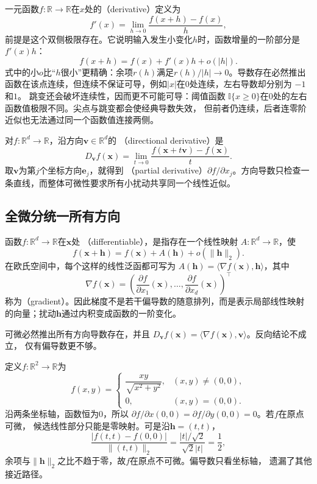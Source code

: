 一元函数$f:\mathbb{R}\to\mathbb{R}$在$x$处的（derivative）定义为
\[   f'(x)=\lim_{h\to0}\frac{f(x+h)-f(x)}{h}, \]
前提是这个双侧极限存在。它说明输入发生小变化$h$时，函数增量的一阶部分是$f'(x)h$：
\begin{equation}
  f(x+h)=f(x)+f'(x)h+o(|h|).
\label{eq:analysis-scalar-first-order}
\end{equation}
式中的小$o$比“$h$很小”更精确：余项$r(h)$满足$r(h)/|h|\to0$。导数存在必然推出函数在该点连续，但连续不保证可导，例如$|x|$在$0$处连续，左右导数却分别为 $-1$和$1$。
跳变还会破坏连续性，因而更不可能可导：阈值函数
$\mathbb{I}\{x\geq0\}$在$0$处的左右函数值极限不同。尖点与跳变都会使经典导数失效，
但前者仍连续，后者连零阶近似也无法通过同一个函数值连接两侧。

对$f:\mathbb{R}^d\to\mathbb{R}$，沿方向$\bm{v}\in\mathbb{R}^d$的
（directional derivative）是
\[   D_{\bm{v}}f(\bm{x})   =   \lim_{t\to0}   \frac{f(\bm{x}+t\bm{v})-f(\bm{x})}{t}. \]
取$\bm{v}$为第$j$个坐标方向$\bm{e}_j$，就得到
（partial derivative）$\partial f/\partial x_j$。方向导数只检查一条直线，而整体可微性要求所有小扰动共享同一个线性近似。
\subsection{全微分统一所有方向}

函数$f:\mathbb{R}^d\to\mathbb{R}$在$\bm{x}$处
（differentiable），是指存在一个线性映射 $A:\mathbb{R}^d\to\mathbb{R}$，使
\begin{equation}
  f(\bm{x}+\bm{h})
  =
  f(\bm{x})+A(\bm{h})+o(\lVert\bm{h}\rVert_2).
\label{eq:analysis-total-differentiability}
\end{equation}
在欧氏空间中，每个这样的线性泛函都可写为 $A(\bm{h})=\langle\nabla f(\bm{x}),\bm{h}\rangle$，其中
\[   \nabla f(\bm{x})   =   \left(     \frac{\partial f}{\partial x_1}(\bm{x}),\ldots,     \frac{\partial f}{\partial x_d}(\bm{x})   \right)^{\top} \]
称为（gradient）。因此梯度不是若干偏导数的随意排列，而是表示局部线性映射的向量；扰动$\bm{h}$通过内积变成函数的一阶变化。

可微必然推出所有方向导数存在，并且 $D_{\bm{v}}f(\bm{x})=\langle\nabla f(\bm{x}),\bm{v}\rangle$。反向结论不成立， 仅有偏导数更不够。
\begin{example}[偏导数存在但不可微]
\label{ex:analysis-partials-not-differentiable}
定义$f:\mathbb{R}^2\to\mathbb{R}$为
\[   f(x,y)=
\begin{cases}     \dfrac{xy}{\sqrt{x^2+y^2}}, & (x,y)\neq(0,0),\\[6pt]     0, & (x,y)=(0,0).
\end{cases} \]
沿两条坐标轴，函数恒为$0$，所以 $\partial f/\partial x(0,0)=\partial f/\partial y(0,0)=0$。若$f$在原点可微， 候选线性部分只能是零映射。可是沿$\bm{h}=(t,t)$，
\[   \frac{|f(t,t)-f(0,0)|}{\lVert(t,t)\rVert_2}   =   \frac{|t|/\sqrt{2}}{\sqrt{2}|t|}   =\frac12, \]
余项与$\lVert\bm{h}\rVert_2$之比不趋于零，故$f$在原点不可微。偏导数只看坐标轴， 遗漏了其他接近路径。
\end{example}

